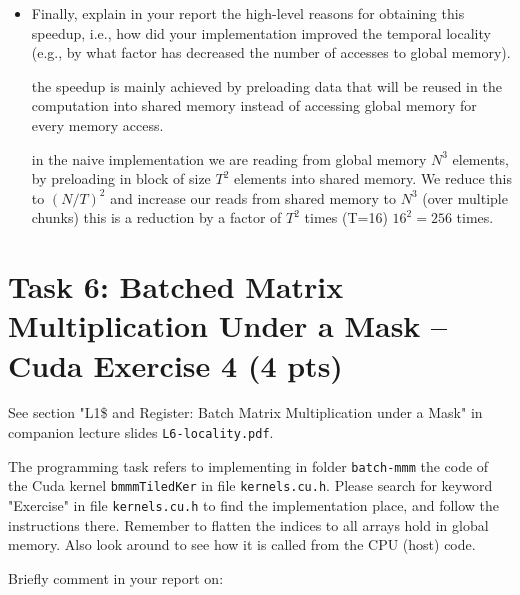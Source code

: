 \documentclass{article}
\begin{document}
\begin{itemize}
    \item Finally, explain in your report the high-level reasons for obtaining
    this speedup, i.e., how did your implementation improved the temporal
    locality (e.g., by what factor has decreased the number of accesses to
    global memory).

    the speedup is mainly achieved by preloading data that will be reused in the computation into shared memory instead of accessing global memory for every memory access.

    in the naive implementation we are reading from global memory $N^3$ elements, 
    by preloading in block of size $T^2$ elements into shared memory. 
    We reduce this to \((N/T)^2 \) and increase our reads from shared memory to $N^3$ (over multiple chunks)
    this is a reduction by a factor of $T^2$ times (T=16) $16^2 = 256$ times. 
    

\end{itemize}

\section{Task 6: Batched Matrix Multiplication Under a Mask -- Cuda Exercise 4 (4 pts)}

See section "L1\$ and Register: Batch Matrix Multiplication under a Mask" in companion lecture slides \texttt{L6-locality.pdf}.

The programming task refers to implementing in folder \texttt{batch-mmm} the code of the Cuda kernel \texttt{bmmmTiledKer} in file \texttt{kernels.cu.h}. Please search for keyword "Exercise" in file \texttt{kernels.cu.h} to find the implementation place, and follow the instructions there. Remember to flatten the indices to all arrays hold in global memory. Also look around to see how it is called from the CPU (host) code.

Briefly comment in your report on:
\end{document}
